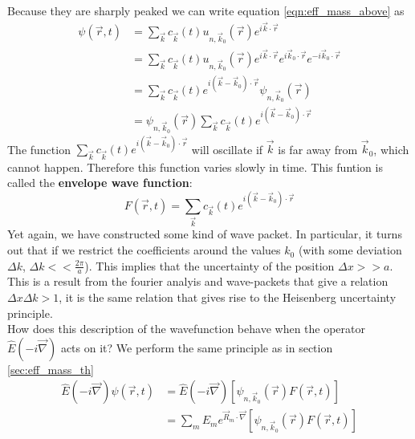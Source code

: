 {\begin{center}
	\end{center}
	Because they are sharply peaked we can write equation \ref{eqn:eff_mass_above} as
	\begin{align}
		\psi(\vec{r}, t) &= \sum_{\vec{k}}^{}c_{\vec{k}}(t)u_{n, \vec{k}_0}(\vec{r})e^{i\vec{k}\cdot\vec{r}} \nonumber \\
		&= \sum_{\vec{k}}^{}c_{\vec{k}}(t)u_{n, \vec{k}_0}(\vec{r})e^{i\vec{k}\cdot\vec{r}}e^{i\vec{k}_0\cdot\vec{r}}e^{-i\vec{k}_0\cdot\vec{r}} \nonumber \\
		&= \sum_{\vec{k}}^{}c_{\vec{k}}(t)e^{i(\vec{k}-\vec{k}_0)\cdot\vec{r}}\psi_{n, \vec{k}_0}(\vec{r}) \nonumber \\
		&= \psi_{n, \vec{k}_0}(\vec{r})\sum_{\vec{k}}^{}c_{\vec{k}}(t)e^{i(\vec{k}-\vec{k}_0)\cdot\vec{r}} \label{eqn:new_psi}
	\end{align}
	The function $\sum_{\vec{k}}^{}c_{\vec{k}}(t)e^{i(\vec{k}-\vec{k}_0)\cdot\vec{r}}$ will oscillate if $\vec{k}$ is far away from $\vec{k}_0$, which cannot happen. Therefore this function varies slowly in time. This funtion is called the \textbf{envelope wave function}:
	\begin{equation}
		F(\vec{r}, t) = \sum_{\vec{k}}^{}c_{\vec{k}}(t)e^{i(\vec{k}-\vec{k}_0)\cdot\vec{r}}
	\end{equation}
	Yet again, we have constructed some kind of wave packet. In particular, it turns out that if we restrict the coefficients around the values $k_0$ (with some deviation $\Delta k$, $\Delta k << \frac{2\pi}{a}$). This implies that the uncertainty of the position $\Delta x >> a$. \\
	This is a result from the fourier analyis and wave-packets that give a relation $\Delta x \Delta k > 1$, it is the same relation that gives rise to the Heisenberg uncertainty principle. \\ \newline
	How does this description of the wavefunction behave when the operator $\hat{E}(-i\vec{\nabla})$ acts on it? We perform the same principle as in section \ref{sec:eff_mass_th}
	\begin{align}
		\hat{E}(-i\vec{\nabla})\psi(\vec{r}, t) &= \hat{E}(-i\vec{\nabla})\left[\psi_{n, \vec{k}_0}(\vec{r})F(\vec{r}, t)\right] \\
		&= \sum_m^{}E_me^{\vec{R}_m\cdot\vec{\nabla}}\left[\psi_{n, \vec{k}_0}(\vec{r})F(\vec{r}, t)\right] \\

\end{align}}
